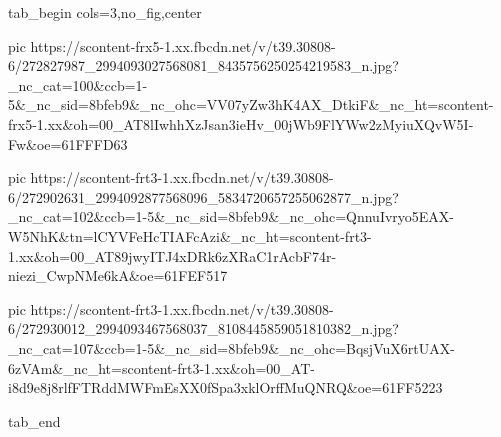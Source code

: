  
 
 
 
 


\ifcmt
  tab_begin cols=3,no_fig,center

     pic https://scontent-frx5-1.xx.fbcdn.net/v/t39.30808-6/272827987_2994093027568081_8435756250254219583_n.jpg?_nc_cat=100&ccb=1-5&_nc_sid=8bfeb9&_nc_ohc=VV07yZw3hK4AX_DtkiF&_nc_ht=scontent-frx5-1.xx&oh=00_AT8lIwhhXzJsan3ieHv_00jWb9FlYWw2zMyiuXQvW5I-Fw&oe=61FFFD63

     pic https://scontent-frt3-1.xx.fbcdn.net/v/t39.30808-6/272902631_2994092877568096_5834720657255062877_n.jpg?_nc_cat=102&ccb=1-5&_nc_sid=8bfeb9&_nc_ohc=QnnuIvryo5EAX-W5NhK&tn=lCYVFeHcTIAFcAzi&_nc_ht=scontent-frt3-1.xx&oh=00_AT89jwyITJ4xDRk6zXRaC1rAcbF74r-niezi_CwpNMe6kA&oe=61FEF517

     pic https://scontent-frt3-1.xx.fbcdn.net/v/t39.30808-6/272930012_2994093467568037_8108445859051810382_n.jpg?_nc_cat=107&ccb=1-5&_nc_sid=8bfeb9&_nc_ohc=BqsjVuX6rtUAX-6zVAm&_nc_ht=scontent-frt3-1.xx&oh=00_AT-i8d9e8j8rlfFTRddMWFmEsXX0fSpa3xklOrffMuQNRQ&oe=61FF5223

  tab_end
\fi

